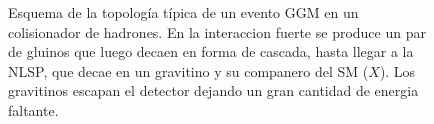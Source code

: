 \begin{figure}[!htbp]
  \centering
  
  \caption{Esquema de la topología típica de un evento GGM en un colisionador de hadrones.
    En la interaccion fuerte se produce un par de gluinos que luego decaen en forma de cascada,
    hasta llegar a la NLSP, que decae en un gravitino {\gravino} y su companero del SM ($X$). Los
    gravitinos escapan el detector dejando un gran cantidad de energia faltante.}
  \label{fig:ggm_event}
\end{figure}








